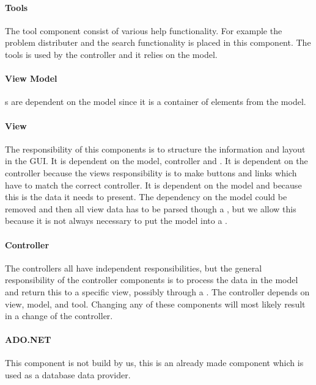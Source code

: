 \paragraph{Tools}
The tool component consist of various help functionality. For example the problem distributer and the search functionality is placed in this component. The tools is used by the controller and it relies on the model. 

\paragraph{View Model}
\viewmodel{}s are dependent on the model since it is a container of elements from the model.

\paragraph{View} 
The responsibility of this components is to structure the information and layout in the GUI. 
It is dependent on the model, controller and \viewmodel{}. It is dependent on the controller because the views responsibility is to make buttons and links which have to match the correct controller. It is dependent on the model and \viewmodel{} because this is the data it needs to present. 
The dependency on the model could be removed and then all view data has to be parsed though a \viewmodel{}, but we allow this because it is not always necessary to put the model into a \viewmodel{}. 

\paragraph{Controller}
The controllers all have independent responsibilities, but the general responsibility of the controller components is to process the data in the model and return this to a specific view, possibly through a \viewmodel{}. The controller depends on view, model, \viewmodel{} and tool. Changing any of these components will most likely result in a change of the controller. 

\paragraph{ADO.NET}
This component is not build by us, this is an already made component which is used as a database data provider. 



